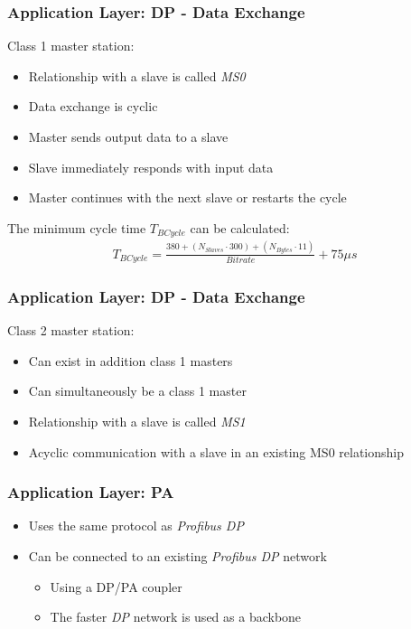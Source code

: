 \documentclass{beamer}
\begin{document}
\begin{frame}
  \frametitle{Application Layer: DP - Data Exchange}
  Class 1 master station:
  \begin{itemize}
    \item Relationship with a slave is called \textit{MS0}
    \item Data exchange is cyclic
    \item Master sends output data to a slave
    \item Slave immediately responds with input data
    \item Master continues with the next slave or restarts the cycle
  \end{itemize}
  \vspace{10pt}
  The minimum cycle time $T_{BCycle}$ can be calculated:
  \begin{align}
    T_{BCycle} = \frac{380 + (N_{Slaves} \cdot 300) + (N_{Bytes} \cdot 11)}{Bitrate} + 75
    \mu s
    \label{minimumcycletime}
  \end{align}
\end{frame}

\begin{frame}
  \frametitle{Application Layer: DP - Data Exchange}
  Class 2 master station:
  \begin{itemize}
    \item Can exist in addition class 1 masters
    \item Can simultaneously be a class 1 master
    \item Relationship with a slave is called \textit{MS1}
    \item Acyclic communication with a slave in an existing MS0 relationship
  \end{itemize}
\end{frame}

\begin{frame}
  \frametitle{Application Layer: PA}
  \begin{itemize}
    \item Uses the same protocol as \textit{Profibus DP}
    \item Can be connected to an existing \textit{Profibus DP} network
      \begin{itemize}
        \item Using a DP/PA coupler
        \item The faster \textit{DP} network is used as a backbone
      \end{itemize}
  \end{itemize}
\end{frame}
\end{document}
